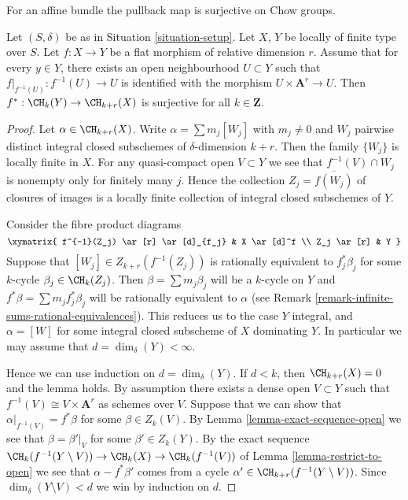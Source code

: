 \noindent
For an affine bundle the pullback map is surjective on Chow groups.

\begin{lemma}
\label{lemma-pullback-affine-fibres-surjective}
Let $(S, \delta)$ be as in Situation \ref{situation-setup}.
Let $X$, $Y$ be locally of finite type over $S$.
Let $f : X \to Y$ be a flat morphism of relative dimension $r$.
Assume that for every $y \in Y$, there exists an open neighbourhood
$U \subset Y$ such that $f|_{f^{-1}(U)} : f^{-1}(U) \to U$
is identified with the morphism $U \times \mathbf{A}^r \to U$.
Then $f^* : \CH_k(Y) \to \CH_{k + r}(X)$ is surjective for all
$k \in \mathbf{Z}$.
\end{lemma}

\begin{proof}
Let $\alpha \in \CH_{k + r}(X)$.
Write $\alpha = \sum m_j[W_j]$ with $m_j \not = 0$ and
$W_j$ pairwise distinct integral closed subschemes of
$\delta$-dimension $k + r$. Then the family $\{W_j\}$
is locally finite in $X$. For any quasi-compact open
$V \subset Y$ we see that $f^{-1}(V) \cap W_j$
is nonempty only for finitely many $j$. Hence the
collection $Z_j = \overline{f(W_j)}$ of closures
of images is a locally finite collection of integral
closed subschemes of $Y$.

\medskip\noindent
Consider the fibre product diagrams
$$
\xymatrix{
f^{-1}(Z_j) \ar[r] \ar[d]_{f_j} & X \ar[d]^f \\
Z_j \ar[r] & Y
}
$$
Suppose that $[W_j] \in Z_{k + r}(f^{-1}(Z_j))$
is rationally equivalent to $f_j^*\beta_j$ for some
$k$-cycle $\beta_j \in \CH_k(Z_j)$. Then
$\beta = \sum m_j \beta_j$ will be a $k$-cycle on $Y$
and $f^*\beta = \sum m_j f_j^*\beta_j$ will be rationally
equivalent to $\alpha$ (see
Remark \ref{remark-infinite-sums-rational-equivalences}).
This reduces us to the case $Y$ integral, and
$\alpha = [W]$ for some integral closed subscheme
of $X$ dominating $Y$. In particular we may
assume that $d = \dim_\delta(Y) < \infty$.

\medskip\noindent
Hence we can use induction on $d = \dim_\delta(Y)$.
If $d < k$, then $\CH_{k + r}(X) = 0$ and the lemma holds.
By assumption there exists a dense open $V \subset Y$ such
that $f^{-1}(V) \cong V \times \mathbf{A}^r$ as schemes over $V$.
Suppose that we can show that $\alpha|_{f^{-1}(V)} = f^*\beta$
for some $\beta \in Z_k(V)$. By Lemma \ref{lemma-exact-sequence-open}
we see that
$\beta = \beta'|_V$ for some $\beta' \in Z_k(Y)$.
By the exact sequence
$\CH_k(f^{-1}(Y \setminus V)) \to \CH_k(X) \to \CH_k(f^{-1}(V))$
of Lemma \ref{lemma-restrict-to-open}
we see that $\alpha - f^*\beta'$ comes from
a cycle $\alpha' \in \CH_{k + r}(f^{-1}(Y \setminus V))$.
Since $\dim_\delta(Y \setminus V) < d$ we win by
induction on $d$.


\end{proof}
